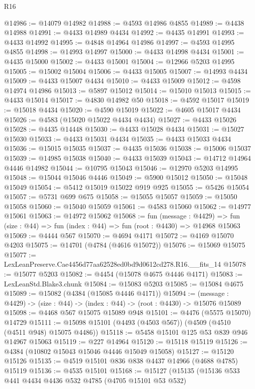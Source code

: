 \begin{lexlean}{R16}
\begin{coremodule}
@14986 := @14079 @14982
@14988 := @4593 @14986 @4855
@14989 := @4438 @14988
@14991 := @4433 @14989 @4434
@14992 := @4435 @14991
@14993 := @4433 @14992
@14995 := @4848 @14964 @14986
@14997 := @4593 @14995 @4855
@14998 := @14993 @14997
@15000 := @4433 @14998 @4434
@15001 := @4435 @15000
@15002 := @4433 @15001
@15004 := @12966 @5203 @14995
@15005 := @15002 @15004
@15006 := @4433 @15005
@15007 := @14993 @4434
@15009 := @4433 @15007 @4434
@15010 := @4433 @15009
@15012 := @4598 @14974 @14986
@15013 := @5897 @15012
@15014 := @15010 @15013
@15015 := @4433 @15014
@15017 := @4830 @14982 @50
@15018 := @4592 @15017
@15019 := @15018 @4434
@15020 := @4590 @15019
@15022 := @4605 @15017 @4434
@15026 := @4583 (@15020 @15022 @4434 @4434)
@15027 := @4433 @15026
@15028 := @4435 @14448
@15030 := @4433 @15028 @4434
@15031 := @15027 @15030
@15033 := @4433 @15031 @4434
@15035 := @4433 @15033 @4434
@15036 := @15015 @15035
@15037 := @4435 @15036
@15038 := @15006 @15037
@15039 := @14985 @15038
@15040 := @4433 @15039
@15043 := @14712 @14964 @4446 @14982
@15044 := @10795 @15043
@15046 := @12970 @5203 @14995
@15048 := @15044 @15046 @4446
@15049 := @5900 @15012
@15050 := @15048 @15049
@15054 := @5412 @15019 @15022 @919 @925
@15055 := @5426 @15054
@15057 := @5731 @699 @675
@15058 := @15055 @15057
@15059 := @15050 @15058
@15060 := @15040 @15059
@15061 := @4583 @15060
@15062 := @14977 @15061
@15063 := @14972 @15062
@15068 := fun (message : @4429) =>
  fun (size : @44) => fun (index : @44) => fun (root : @4430) => @14968 @15063
@15069 := @4444 @567
@15070 := @4694 @4171
@15072 := @4169 @15070 @4203
@15075 := @14701 (@4784 (@4616 @15072))
@15076 := @15069 @15075
@15077 := LexLeanPreserve.Cae4456d77aa62528ed0bd9d0612cd278.R16.__fits_14
@15078 := @15077 @5203
@15082 := @4454 (@15078 @4675 @4446 @4171)
@15083 := LexLeanStd.Blake3.chunk
@15084 := @15083 @5203
@15085 := @15084 @4675
@15089 := @15082 (@4384 (@15085 @4446 @4171))
@15094 := (message : @4429) -> (size : @44) -> (index : @44) -> (root : @4430) -> @15076 @15089
@15098 := @4468 @567 @15075 @15089 @948
@15101 := @4476 (@5575 @15070) @14729
@15111 := @15098 @15101 (@4493 (@4503 @567)) (@4509 (@4510 (@4511 @948) @15075 @4486))
@15118 := @5458 @15101 @125 @53 @839 @946 @14967 @15063
@15119 := @227 @14964
@15120 := @15118 @15119
@15126 := @4384 (@10802 @15043 @15046 @4446 @15049 @15058)
@15127 := @15120 @15126
@15135 := @4519 @15101 @836 @838 @4437 @14966 (@4688 @4785) @15119
@15136 := @4535 @15101
@15168 := @15127
    (@15135
      (@15136
        @533
        @441
        @4434
        @4436
        @532
        @4785
        (@4705 @15101 @53 @532)

\end{coremodule}
\end{lexlean}
